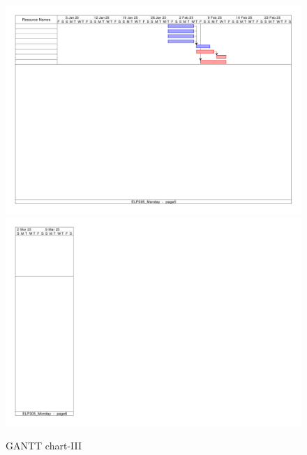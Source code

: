 \documentclass[12pt,a4paper]{article}
\begin{document}
\begin{figure}[H]
    \centering
    \includegraphics[width=1.2\textwidth]{gantt_new-5.png} %
    \includegraphics[width=1.2\textwidth]{gantt_new-6.png} %
    
    \caption{GANTT chart-III}
    
    \label{fig:GANTT CHART}
\end{figure}
\end{document}
